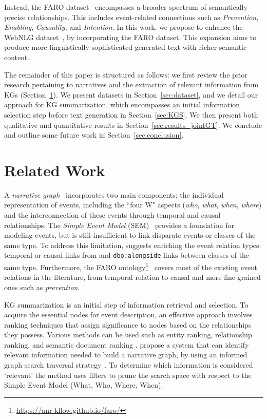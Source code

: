 \documentclass[
hf, %
]{ceurart}
\begin{document}
Instead, the FARO dataset~\cite{beyond_causality,sem_data_aug} encompasses a broader spectrum of semantically precise relationships. This includes event-related connections such as \textit{Prevention}, \textit{Enabling}, \textit{Causality}, and \textit{Intention}. In this work, we propose to enhance the WebNLG dataset~\cite{gardent-etal-2017-creating}, by incorporating the FARO dataset. This expansion aims to produce more linguistically sophisticated generated text with richer semantic content.

The remainder of this paper is structured as follows: we first review the prior research pertaining to narratives and the extraction of relevant information from KGs (Section~\ref{sec:related-work}). We present datasets in Section~\ref{sec:dataset}, and we detail our approach for KG summarization, which encompasses an initial information selection step before text generation in Section~\ref{sec:KGS}. We then present both qualitative and quantitative results in Section~\ref{sec:results_jointGT}. We conclude and outline some future work in Section~\ref{sec:conclusion}.

\section{Related Work}
\label{sec:related-work}
A \textit{narrative graph}~\cite{Build_narrative} incorporates two main components: the individual representation of events, including the ``four W" aspects (\textit{who}, \textit{what}, \textit{when}, \textit{where}) and the interconnection of these events through temporal and causal relationships. The \textit{Simple Event Model} (SEM)~\cite{SEM} provides a foundation for modeling events, but is still insufficient to link disparate events or classes of the same type. To address this limitation, \citeauthor{Build_narrative} \cite{Build_narrative} suggests enriching the event relation types: temporal or causal links from \citeauthor{allen} \cite{allen} and \texttt{dbo:alongside} links between classes of the same type. Furthermore, the FARO ontology\footnote{\url{https://anr-kflow.github.io/faro/}}~\cite{beyond_causality} covers most of the existing event relations in the literature, from temporal relation to causal and more fine-grained ones such as \textit{prevention}.

KG summarization is an initial step of information retrieval and selection. To acquire the essential nodes for event description, an effective approach involves ranking techniques that assign significance to nodes based on the relationships they possess. Various methods can be used such as entity ranking, relationship ranking, and semantic document ranking \cite{JINDAL2014416}. \citeauthor{graph_traversal} propose a system that can identify relevant information needed to build a narrative graph, by using an informed graph search traversal strategy~\cite{graph_traversal}. To determine which information is considered `relevant' the method uses filters to prune the search space with respect to the Simple Event Model (What, Who, Where, When).
\end{document}
